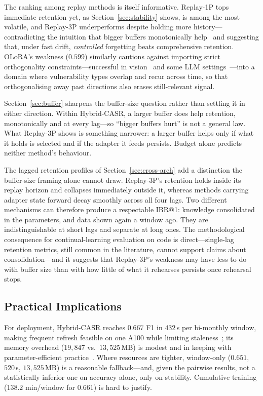 \documentclass[a4paper,twoside]{article}
\begin{document}
The ranking among replay methods is itself informative. Replay-1P tops immediate retention yet, as Section~\ref{sec:stability} shows, is among the most volatile, and Replay-3P underperforms despite holding more history---contradicting the intuition that bigger buffers monotonically help~\citep{Han2023CLCompare} and suggesting that, under fast drift, \emph{controlled} forgetting beats comprehensive retention. OLoRA's weakness ($0.599$) similarly cautions against importing strict orthogonality constraints---successful in vision~\citep{LopezPaz2017GEM} and some LLM settings~\citep{Song2023ConPET}---into a domain where vulnerability types overlap and recur across time, so that orthogonalising away past directions also erases still-relevant signal.

Section~\ref{sec:buffer} sharpens the buffer-size question rather than settling it in either direction. Within Hybrid-CASR, a larger buffer does help retention, monotonically and at every lag---so ``bigger buffers hurt'' is not a general law. What Replay-3P shows is something narrower: a larger buffer helps only if what it holds is selected and if the adapter it feeds persists. Budget alone predicts neither method's behaviour.

The lagged retention profiles of Section~\ref{sec:cross-arch} add a distinction the buffer-size framing alone cannot draw. Replay-3P's retention holds inside its replay horizon and collapses immediately outside it, whereas methods carrying adapter state forward decay smoothly across all four lags. Two different mechanisms can therefore produce a respectable IBR@1: knowledge consolidated in the parameters, and data shown again a window ago. They are indistinguishable at short lags and separate at long ones. The methodological consequence for continual-learning evaluation on code is direct---single-lag retention metrics, still common in the literature, cannot support claims about consolidation---and it suggests that Replay-3P's weakness may have less to do with buffer size than with how little of what it rehearses persists once rehearsal stops.

\subsection{Practical Implications}
\label{sec:disc-practical}

\noindent
For deployment, Hybrid-CASR reaches $0.667$ F1 in $432$\,s per bi-monthly window, making frequent refresh feasible on one A100 while limiting staleness~\citep{Lyu2022Splitting}; its memory overhead ($19{,}847$ vs.\ $13{,}525$\,MB) is modest and in keeping with parameter-efficient practice~\citep{Hu2021LoRA,Dettmers2023QLoRA}. Where resources are tighter, window-only ($0.651$, $520$\,s, $13{,}525$\,MB) is a reasonable fallback---and, given the pairwise results, not a statistically inferior one on accuracy alone, only on stability. Cumulative training ($138.2$ min/window for $0.661$) is hard to justify.
\end{document}
